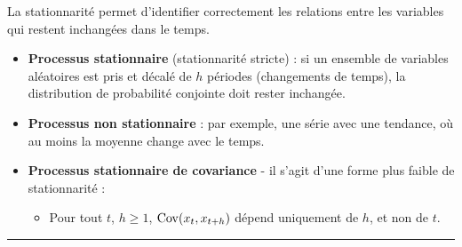   \begin{f}[Stationnarité]

La stationnarité permet d'identifier correctement les relations entre les variables qui restent inchangées dans le temps.

\begin{itemize}[leftmargin=*]
	\item \textbf{Processus stationnaire} (stationnarité stricte) : si un ensemble de variables aléatoires est pris et décalé de $h$ périodes (changements de temps), la distribution de probabilité conjointe doit rester inchangée.
	\item \textbf{Processus non stationnaire} : par exemple, une série avec une tendance, où au moins la moyenne change avec le temps.
	\item \textbf{Processus stationnaire de covariance} - il s'agit d'une forme plus faible de stationnarité :
	
	\begin{itemize}[leftmargin=*]
		
		\item Pour tout $t$, $h \geq 1$, $\mathrm{Cov}(x_{t}, x_{t + h})$ dépend uniquement de $h$, et non de $t$.
	\end{itemize}
\end{itemize}

\end{f}  \hrule

